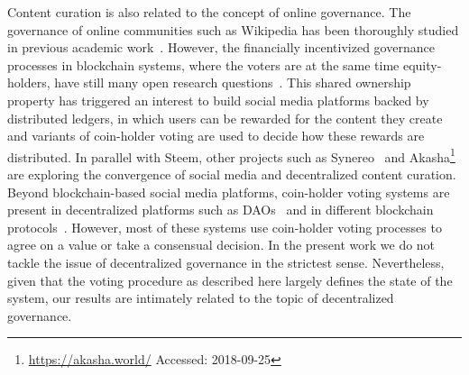   Content curation is also related to the concept of online governance. The governance of online communities such as Wikipedia has been thoroughly studied in previous academic work~\cite{leskovec2010governance,forte2008scaling}. However, the financially incentivized governance processes in blockchain systems, where the voters are at the same time equity-holders, have still many open research questions~\cite{vitalik,ehrsam}. This shared ownership property has triggered an interest to build social media platforms backed by distributed ledgers, in which users can be rewarded for the content they create and variants of coin-holder voting are used to decide how these rewards are distributed. In parallel with Steem, other projects such as Synereo~\cite{synereo} and Akasha\footnote{\url{https://akasha.world/} Accessed: 2018-09-25} are exploring the convergence of social media and decentralized content curation.
   Beyond blockchain-based social media platforms, coin-holder voting systems are present in decentralized platforms such as DAOs~\cite{darkdaos} and in different blockchain protocols~\cite{tezos}. However, most of these systems use coin-holder voting processes to agree on a value or take a consensual decision.
    In the present work we do not tackle the issue of decentralized governance in the strictest sense. Nevertheless, given that the voting procedure as described here largely defines the state of the system, our results are intimately related to the topic of decentralized governance.

